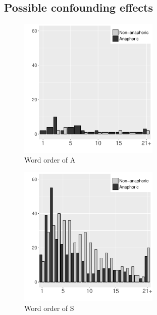 \subsection{Possible confounding effects}\label{WO:Dis:Confounding}

\begin{figure}
	\begin{center}
	\includegraphics[width=0.6\textwidth]{figure/DEPositionASPA.pdf}
	\caption{Word order of A}
	\label{DEPositionASPAF}
	\end{center}
\end{figure}
\begin{figure}
	\begin{center}
	\includegraphics[width=0.6\textwidth]{figure/DEPositionASPS.pdf}
	\caption{Word order of S}
	\label{DEPositionASPSF}
	\end{center}
\end{figure}
